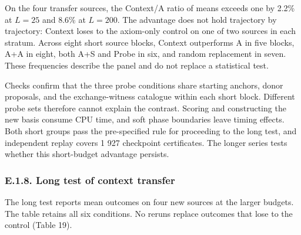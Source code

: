 \documentclass[pdflatex,sn-basic,Numbered]{sn-jnl}
\begin{document}
\endgroup

On the four transfer sources, the Context/A ratio of means exceeds one by 2.2\% at \(L = 25\) and 8.6\% at \(L = 200\). The advantage does not hold trajectory by trajectory: Context loses to the axiom-only control on one of two sources in each stratum. Across eight short source blocks, Context outperforms A in five blocks, A+A in eight, both A+S and Probe in six, and random replacement in seven. These frequencies describe the panel and do not replace a statistical test.

Checks confirm that the three probe conditions share starting anchors, donor proposals, and the exchange-witness catalogue within each short block. Different probe sets therefore cannot explain the contrast. Scoring and constructing the new basis consume CPU time, and soft phase boundaries leave timing effects. Both short groups pass the pre-specified rule for proceeding to the long test, and independent replay covers 1 927 checkpoint certificates. The longer series tests whether this short-budget advantage persists.

\subsubsection*{E.1.8. Long test of context transfer}\label{e.1.8.-long-test-of-context-transfer}

The long test reports mean outcomes on four new sources at the larger budgets. The table retains all six conditions. No reruns replace outcomes that lose to the control (Table 19).

\begingroup
\small
\setlength{\tabcolsep}{3pt}
\renewcommand{\arraystretch}{1.13}
\end{document}
